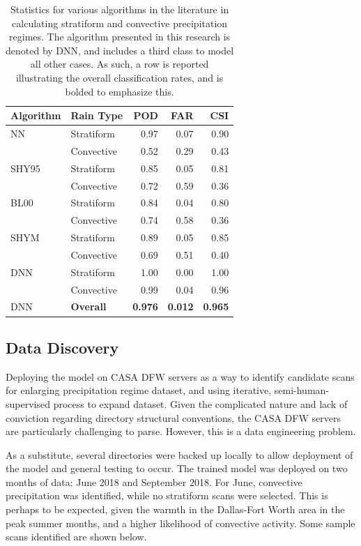 \begin{table}
	\begin{tabular}{l l r r r }
		Algorithm & Rain Type & POD & FAR & CSI \\
		\hline
		NN\cite{anagnostou2004convective} & Stratiform & 0.97 & 0.07 & 0.90  \\
		   & Convective & 0.52 & 0.29 & 0.43  \\
		SHY95\cite{steiner1995climatological} & Stratiform & 0.85 & 0.05 & 0.81  \\
		      & Convective & 0.72 & 0.59 & 0.36  \\
		BL00\cite{biggerstaff2000improved} & Stratiform & 0.84 & 0.04 & 0.80  \\
		     & Convective & 0.74 & 0.58 & 0.36 \\
		SHYM\cite{anagnostou2004convective} & Stratiform & 0.89 & 0.05 & 0.85  \\
		     & Convective & 0.69 & 0.51 & 0.40 \\
		\hline
		DNN & Stratiform & 1.00 & 0.00 & 1.00 \\
		    & Convective & 0.99 & 0.04 & 0.96 \\
		DNN & \textbf{Overall} & \textbf{0.976} & \textbf{0.012} & \textbf{0.965} \\
	\end{tabular}
	\caption{Statistics for various algorithms in the literature in calculating stratiform and convective precipitation regimes. The algorithm presented in this research is denoted by DNN, and includes a third class to model all other cases. As such, a row is reported illustrating the overall classification rates, and is bolded to emphasize this.}
	\label{table:classifying_zh_comparison}
\end{table}

\subsection{Data Discovery}
\label{ssec:classifying_discovery}

Deploying the model on CASA DFW servers as a way to identify candidate scans for enlarging precipitation regime dataset, and using iterative, semi-human-supervised process to expand dataset.
Given the complicated nature and lack of conviction regarding directory structural conventions, the CASA DFW servers are particularly challenging to parse.
However, this is a data engineering problem.

As a substitute, several directories were backed up locally to allow deployment of the model and general testing to occur.
The trained model was deployed on two months of data: June 2018 and September 2018. 
For June, convective precipitation was identified, while no stratiform scans were selected.
This is perhaps to be expected, given the warmth in the Dallas-Fort Worth area in the peak summer months, and a higher likelihood of convective activity.
Some sample scans identified are shown below.

